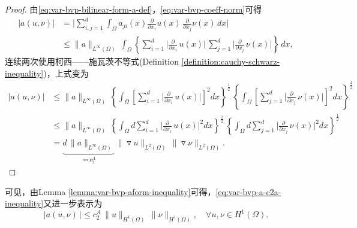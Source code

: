 \begin{proof}
  由\eqref{eq:var-bvp-bilinear-form-a-def}，\eqref{eq:var-bvp-coeff-norm}可得
  \begin{equation*}
    \begin{split}
      \big| a \left(u,\nu \right) \big| &= \Big| \sum_{i,j=1}^d \int_{\Omega} a_{ji}(x) \frac{\partial}{\partial x_i} u(x) \, \frac{\partial}{\partial x_j} \nu(x) \, dx \Big| \\
      & \le \big\| a \big\|_{L^{\infty}(\Omega)} \,
      \int_{\Omega} \left\{
      \sum_{i=1}^{d} \Big| \frac{\partial}{\partial x_i} \, u(x) \Big| \,
      \sum_{j=1}^{d} \Big| \frac{\partial}{\partial x_j} \, \nu(x) \Big| \right\} \,
      dx,
      \end{split}
  \end{equation*}
连续两次使用柯西——施瓦茨不等式(Definition \ref{definition:cauchy-schwarz-inequality})，上式变为
\begin{equation*}
  \begin{split}
    \big| a \left(u,\nu \right) \big|
    & \le \big\| a \big\|_{L^{\infty}(\Omega)} \,
    \left\{
    \int_{\Omega}
    \left[
    \sum_{i=1}^{d} \Big| \frac{\partial}{\partial x_i} \, u(x) \Big|
    \right]^2  dx
    \right\}^{\frac{1}{2}} \,
    \left\{
    \int_{\Omega}
    \left[
    \sum_{j=1}^{d} \Big| \frac{\partial}{\partial x_j} \, \nu(x) \Big|
    \right]^2  dx
    \right\}^{\frac{1}{2}} \\
    & \le \big\| a \big\|_{L^{\infty}(\Omega)} \,
    \left\{
    \int_{\Omega} d
    \sum_{i=1}^{d}
    \Big|
    \frac{\partial}{\partial x_i} \, u(x) \Big|^2
    dx
    \right\}^{\frac{1}{2}} \,
    \left\{
    \int_{\Omega} d
    \sum_{j=1}^{d}
    \Big|
    \frac{\partial}{\partial x_j} \, \nu(x) \Big|^2
    dx
    \right\}^{\frac{1}{2}} \, \\
    & = \underbrace{d \, \big\| a \big\|_{L^{\infty}(\Omega)}}_{\eqqcolon c_2^A} \,
    \big\| \triangledown u \big\|_{L^{2}(\Omega)} \,
    \big\| \triangledown \nu \big\|_{L^{2}(\Omega)}. \, %
  \end{split}
\end{equation*}
\end{proof}

可见，由Lemma \ref{lemma:var-bvp-aform-inequality}可得，\eqref{eq:var-bvp-a-c2a-inequality}又进一步表示为
\begin{equation}
  \label{eq:var-bvp-aform-inequality-norm}
  \big| a \left(u,\nu \right) \, \big| \le c_2^A \, \big\| u \big\|_{H^{1}(\Omega)} \, \big\| \nu \big\|_{H^{1}(\Omega)}, \quad \forall u,\nu \in H^{1}(\Omega).
\end{equation}

